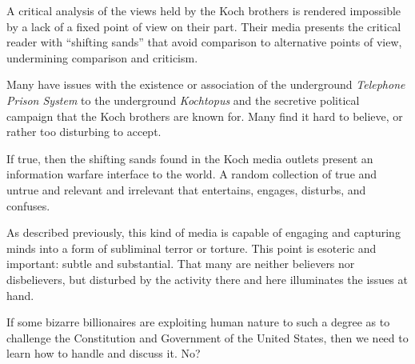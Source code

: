 

A critical analysis of the views held by the Koch brothers is rendered
impossible by a lack of a fixed point of view on their part.  Their
media presents the critical reader with ``shifting sands'' that avoid
comparison to alternative points of view, undermining comparison and
criticism.

Many have issues with the existence or association of the underground
{\it Telephone Prison System} to the underground {\it Kochtopus} and
the secretive political campaign that the Koch brothers are known for.
Many find it hard to believe, or rather too disturbing to accept.

If true, then the shifting sands found in the Koch media outlets
present an information warfare interface to the world.  A random
collection of true and untrue and relevant and irrelevant that
entertains, engages, disturbs, and confuses.  

As described previously, this kind of media is capable of engaging and
capturing minds into a form of subliminal terror or torture.  This
point is esoteric and important: subtle and substantial.  That many
are neither believers nor disbelievers, but disturbed by the activity
there and here illuminates the issues at hand.

If some bizarre billionaires are exploiting human nature to such a
degree as to challenge the Constitution and Government of the United
States, then we need to learn how to handle and discuss it.  No?



\bye
